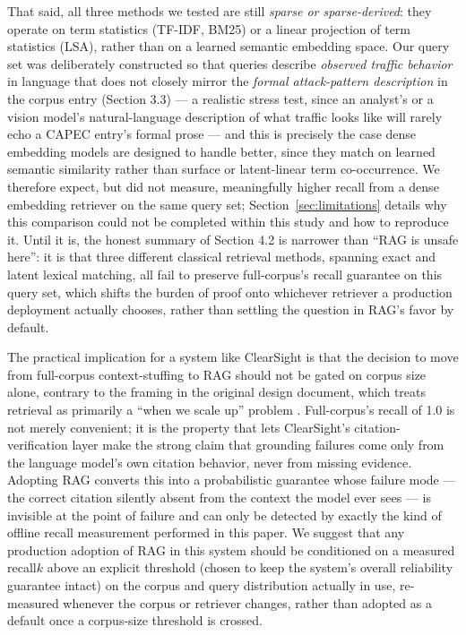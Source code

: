 \documentclass[11pt]{article}
\begin{document}
That said, all three methods we tested are still \emph{sparse or sparse-derived}: they operate on term statistics (TF-IDF, BM25) or a linear projection of term statistics (LSA), rather than on a learned semantic embedding space. Our query set was deliberately constructed so that queries describe \emph{observed traffic behavior} in language that does not closely mirror the \emph{formal attack-pattern description} in the corpus entry (Section 3.3) --- a realistic stress test, since an analyst's or a vision model's natural-language description of what traffic looks like will rarely echo a CAPEC entry's formal prose --- and this is precisely the case dense embedding models are designed to handle better, since they match on learned semantic similarity rather than surface or latent-linear term co-occurrence. We therefore expect, but did not measure, meaningfully higher recall from a dense embedding retriever on the same query set; Section~\ref{sec:limitations} details why this comparison could not be completed within this study and how to reproduce it. Until it is, the honest summary of Section 4.2 is narrower than ``RAG is unsafe here'': it is that three different classical retrieval methods, spanning exact and latent lexical matching, all fail to preserve full-corpus's recall guarantee on this query set, which shifts the burden of proof onto whichever retriever a production deployment actually chooses, rather than settling the question in RAG's favor by default.

The practical implication for a system like ClearSight is that the decision to move from full-corpus context-stuffing to RAG should not be gated on corpus size alone, contrary to the framing in the original design document, which treats retrieval as primarily a ``when we scale up'' problem \citep{clearsight2026}. Full-corpus's recall of 1.0 is not merely convenient; it is the property that lets ClearSight's citation-verification layer make the strong claim that grounding failures come only from the language model's own citation behavior, never from missing evidence. Adopting RAG converts this into a probabilistic guarantee whose failure mode --- the correct citation silently absent from the context the model ever sees --- is invisible at the point of failure and can only be detected by exactly the kind of offline recall measurement performed in this paper. We suggest that any production adoption of RAG in this system should be conditioned on a measured recall\@$k$ above an explicit threshold (chosen to keep the system's overall reliability guarantee intact) on the corpus and query distribution actually in use, re-measured whenever the corpus or retriever changes, rather than adopted as a default once a corpus-size threshold is crossed.
\end{document}
